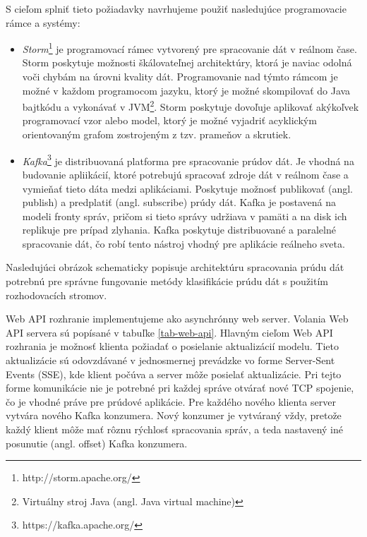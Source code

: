 S cieľom splniť tieto požiadavky navrhujeme použiť nasledujúce programovacie rámce a systémy:
\begin{itemize}
	\item \textit{Storm}\footnote{http://storm.apache.org/} je programovací rámec vytvorený pre spracovanie dát v reálnom čase. Storm poskytuje možnosti škálovateľnej architektúry, ktorá je naviac odolná voči chybám na úrovni kvality dát. Programovanie nad týmto rámcom je možné v každom programocom jazyku, ktorý je možné skompilovať do Java bajtkódu a vykonávať v JVM\footnote{Virtuálny stroj Java (angl. Java virtual machine)}. Storm poskytuje dovoľuje aplikovať akýkoľvek programovací vzor alebo model, ktorý je možné vyjadriť acyklickým orientovaným grafom zostrojeným z tzv. prameňov a skrutiek.
	\item \textit{Kafka}\footnote{https://kafka.apache.org/} je distribuovaná platforma pre spracovanie prúdov dát. Je vhodná na budovanie apliikácií, ktoré potrebujú spracovať zdroje dát v reálnom čase a vymieňať tieto dáta medzi aplikáciami. Poskytuje možnosť publikovať (angl. publish) a predplatiť (angl. subscribe) prúdy dát. Kafka je postavená na modeli fronty správ, pričom si tieto správy udržiava v pamäti a na disk ich replikuje pre prípad zlyhania. Kafka poskytuje distribuované a paralelné spracovanie dát, čo robí tento nástroj vhodný pre aplikácie reálneho sveta.
\end{itemize}

Nasledujúci obrázok schematicky popisuje architektúru spracovania prúdu dát potrebnú pre správne fungovanie metódy klasifikácie prúdu dát s použitím rozhodovacích stromov.
\label{fig:architecture}
\par
Web API rozhranie implementujeme ako asynchrónny web server. Volania Web API servera sú popísané v tabuľke \ref{tab-web-api}. Hlavným cieľom Web API rozhrania je možnosť klienta požiadať o posielanie aktualizácií modelu. Tieto aktualizácie sú odovzdávané v jednosmernej prevádzke vo forme Server-Sent Events (SSE), kde klient počúva a server môže posielať aktualizácie. Pri tejto forme komunikácie nie je potrebné pri každej správe otvárať nové TCP spojenie, čo je vhodné práve pre prúdové aplikácie. Pre každého nového klienta server vytvára nového Kafka konzumera. Nový konzumer je vytváraný vždy, pretože každý klient môže mať rôznu rýchlosť spracovania správ, a teda nastavený iné posunutie (angl. offset) Kafka konzumera.

